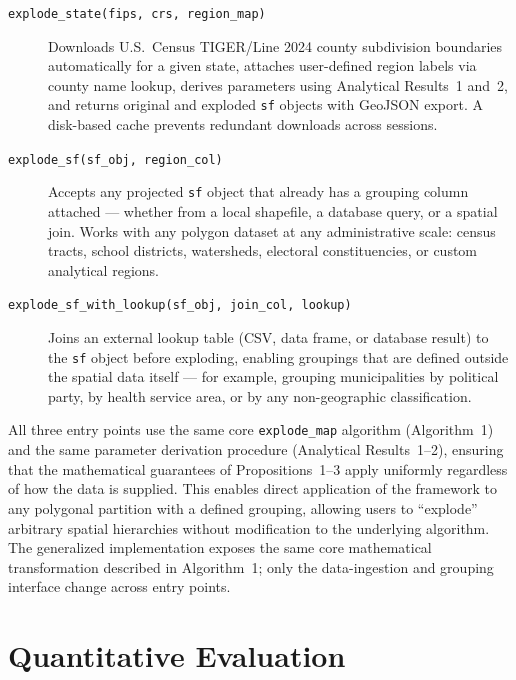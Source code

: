 \documentclass[12pt, a4paper]{article}
\numberwithin{equation}{section}
\begin{document}
\begin{description}
  \item[\texttt{explode\_state(fips, crs, region\_map)}] Downloads U.S.\ Census TIGER/Line 2024 county subdivision boundaries automatically for a given state, attaches user-defined region labels via county name lookup, derives parameters using Analytical Results~1 and~2, and returns original and exploded \texttt{sf} objects with GeoJSON export. A disk-based cache prevents redundant downloads across sessions.

  \item[\texttt{explode\_sf(sf\_obj, region\_col)}] Accepts any projected \texttt{sf} object that already has a grouping column attached --- whether from a local shapefile, a database query, or a spatial join. Works with any polygon dataset at any administrative scale: census tracts, school districts, watersheds, electoral constituencies, or custom analytical regions.

  \item[\texttt{explode\_sf\_with\_lookup(sf\_obj, join\_col, lookup)}] Joins an external lookup table (CSV, data frame, or database result) to the \texttt{sf} object before exploding, enabling groupings that are defined outside the spatial data itself --- for example, grouping municipalities by political party, by health service area, or by any non-geographic classification.
\end{description}

All three entry points use the same core \texttt{explode\_map} algorithm (Algorithm~1) and the same parameter derivation procedure (Analytical Results~1--2), ensuring that the mathematical guarantees of Propositions~1--3 apply uniformly regardless of how the data is supplied. This enables direct application of the framework to any polygonal partition with a defined grouping, allowing users to ``explode'' arbitrary spatial hierarchies without modification to the underlying algorithm. The generalized implementation exposes the same core mathematical transformation described in Algorithm~1; only the data-ingestion and grouping interface change across entry points.

\section{Quantitative Evaluation}
\label{sec:evaluation}
\end{document}
